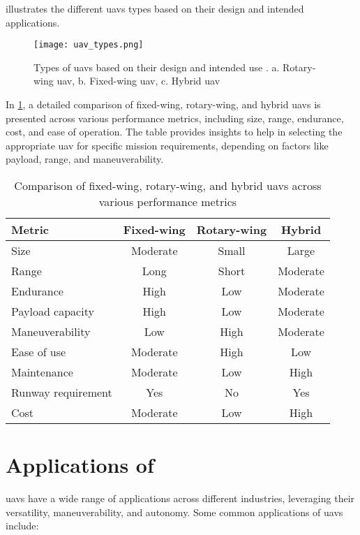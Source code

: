  illustrates the different \glspl{uav} types based on their design and intended applications.

\begin{figure}
  \texttt{[image: uav\_types.png]}
  \caption{Types of \glspl{uav} based on their design and intended use \autocite{mohnani2022role}. a. Rotary-wing \gls{uav}, b. Fixed-wing \gls{uav}, c. Hybrid \gls{uav}}
  \label{fig:uav_types}
\end{figure}

In \cref{tab:uav_categories}, a detailed comparison of fixed-wing, rotary-wing, and hybrid \glspl{uav} is presented across various performance metrics, including size, range, endurance, cost, and ease of operation. The table provides insights to help in selecting the appropriate \gls{uav} for specific mission requirements, depending on factors like payload, range, and maneuverability.

\begin{table}
  \begin{tabular}{ l c c c }
    \toprule
    \textbf{Metric} & \textbf{Fixed-wing} & \textbf{Rotary-wing} & \textbf{Hybrid} \\
    \midrule
    Size & Moderate & Small & Large \\
    Range & Long & Short & Moderate \\
    Endurance & High & Low & Moderate \\
    Payload capacity & High & Low & Moderate \\
    Maneuverability & Low & High & Moderate \\
    Ease of use & Moderate & High & Low \\
    Maintenance & Moderate & Low & High \\
    Runway requirement & Yes & No & Yes \\
    Cost & Moderate & Low & High \\
    \bottomrule
  \end{tabular}
  \caption{Comparison of fixed-wing, rotary-wing, and hybrid \glspl{uav} across various performance metrics}
  \label{tab:uav_categories}
\end{table}

\section{Applications of }

\glspl{uav} have a wide range of applications across different industries, leveraging their versatility, maneuverability, and autonomy. Some common applications of \glspl{uav} include:

